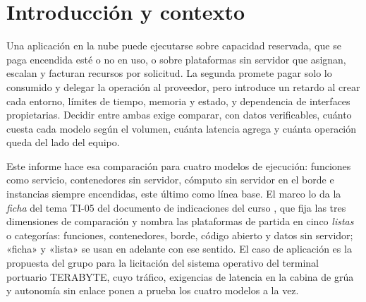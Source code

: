 \documentclass[12pt, letterpaper, table, xcdraw]{inf-pucv}
\begin{document}

{}
\section*{Introducción y contexto}


Una aplicación en la nube puede ejecutarse sobre capacidad reservada, que se paga encendida esté o no en uso, o sobre plataformas sin servidor que asignan, escalan y facturan recursos por solicitud. La segunda promete pagar solo lo consumido y delegar la operación al proveedor, pero introduce un retardo al crear cada entorno, límites de tiempo, memoria y estado, y dependencia de interfaces propietarias. Decidir entre ambas exige comparar, con datos verificables, cuánto cuesta cada modelo según el volumen, cuánta latencia agrega y cuánta operación queda del lado del equipo.

Este informe hace esa comparación para cuatro modelos de ejecución: funciones como servicio, contenedores sin servidor, cómputo sin servidor en el borde e instancias siempre encendidas, este último como línea base. El marco lo da la \emph{ficha} del tema TI-05 del documento de indicaciones del curso \parencite{moya2026indicaciones}, que fija las tres dimensiones de comparación y nombra las plataformas de partida en cinco \emph{listas} o categorías: funciones, contenedores, borde, código abierto y datos sin servidor; «ficha» y «lista» se usan en adelante con ese sentido. El caso de aplicación es la propuesta del grupo para la licitación del sistema operativo del terminal portuario TERABYTE, cuyo tráfico, exigencias de latencia en la cabina de grúa y autonomía sin enlace ponen a prueba los cuatro modelos a la vez.
\end{document}
